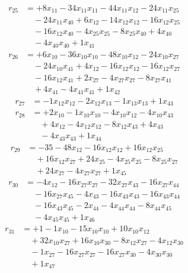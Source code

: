 \[\begin{aligned}
r_{25} &= + 8 x_{11} - 34 x_{11} x_{11} - 44 x_{11} x_{12} - 24 x_{11} x_{25} \\
 &\quad - 24 x_{11} x_{40} + 6 x_{12} - 14 x_{12} x_{12} - 16 x_{12} x_{25} \\
 &\quad - 16 x_{12} x_{40} - 4 x_{25} x_{25} - 8 x_{25} x_{40} + 4 x_{40} \\
 &\quad - 4 x_{40} x_{40} + 1 x_{41}
\end{aligned}\]
\[\begin{aligned}
r_{26} &= + 6 x_{10} - 36 x_{10} x_{10} - 48 x_{10} x_{12} - 24 x_{10} x_{27} \\
 &\quad - 24 x_{10} x_{41} + 4 x_{12} - 16 x_{12} x_{12} - 16 x_{12} x_{27} \\
 &\quad - 16 x_{12} x_{41} + 2 x_{27} - 4 x_{27} x_{27} - 8 x_{27} x_{41} \\
 &\quad + 4 x_{41} - 4 x_{41} x_{41} + 1 x_{42}
\end{aligned}\]
\[\begin{aligned}
r_{27} &= - 1 x_{12} x_{12} - 2 x_{12} x_{13} - 1 x_{13} x_{13} + 1 x_{43}
\end{aligned}\]
\[\begin{aligned}
r_{28} &= + 2 x_{10} - 1 x_{10} x_{10} - 4 x_{10} x_{12} - 4 x_{10} x_{43} \\
 &\quad + 4 x_{12} - 4 x_{12} x_{12} - 8 x_{12} x_{43} + 4 x_{43} \\
 &\quad - 4 x_{43} x_{43} + 1 x_{44}
\end{aligned}\]
\[\begin{aligned}
r_{29} &= - 35 - 48 x_{12} - 16 x_{12} x_{12} + 16 x_{12} x_{25} \\
 &\quad + 16 x_{12} x_{27} + 24 x_{25} - 4 x_{25} x_{25} - 8 x_{25} x_{27} \\
 &\quad + 24 x_{27} - 4 x_{27} x_{27} + 1 x_{45}
\end{aligned}\]
\[\begin{aligned}
r_{30} &= - 4 x_{12} - 16 x_{27} x_{27} - 32 x_{27} x_{43} - 16 x_{27} x_{44} \\
 &\quad - 16 x_{27} x_{45} - 4 x_{43} - 16 x_{43} x_{43} - 16 x_{43} x_{44} \\
 &\quad - 16 x_{43} x_{45} - 2 x_{44} - 4 x_{44} x_{44} - 8 x_{44} x_{45} \\
 &\quad - 4 x_{45} x_{45} + 1 x_{46}
\end{aligned}\]
\[\begin{aligned}
r_{31} &= + 1 - 1 x_{10} - 15 x_{10} x_{10} + 10 x_{10} x_{12} \\
 &\quad + 32 x_{10} x_{27} + 16 x_{10} x_{30} - 8 x_{12} x_{27} - 4 x_{12} x_{30} \\
 &\quad - 1 x_{27} - 16 x_{27} x_{27} - 16 x_{27} x_{30} - 4 x_{30} x_{30} \\
 &\quad + 1 x_{47}
\end{aligned}\]

